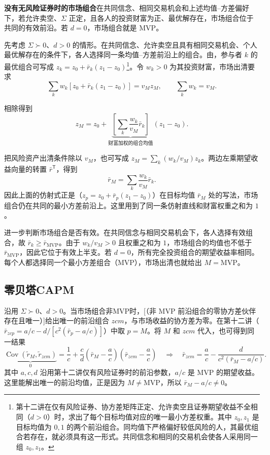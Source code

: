 \begin{tcolorbox}[knowledge]
\textbf{没有无风险证券时的市场组合}\quad 在共同信念、相同交易机会和上述均值--方差偏好下，若允许卖空、$\Sigma$ 正定，且各人的投资财富为正、最优解存在，市场组合位于共同的有效前沿。若 $d=0$，市场组合就是 MVP。
\end{tcolorbox}

\begin{solution}[label-content={证明},blank-type=none]
先考虑 $\Sigma\succ0$、$d>0$ 的情形。在共同信念、允许卖空且具有相同交易机会、个人最优解存在的条件下，各人选择同一条均值--方差前沿上的组合。由，参与者 $k$ 的最优组合可写成 $z_k=z_0+\bar r_k(z_1-z_0)$\footnote{第十二讲在仅有风险证券、协方差矩阵正定、允许卖空且证券期望收益不全相同（$d>0$）时，求出了每个目标均值对应的唯一最小方差权重。其中 $z_0,z_1$ 是目标均值为 $0,1$ 的两个前沿组合。同均值下严格偏好较低风险的人，其最优组合若存在，就必须具有这一形式。共同信念和相同的交易机会使各人采用同一组 $z_0,z_1$。}。令 $w_k>0$ 为其投资财富，市场出清要求
\[
 \sum_kw_k[z_0+\bar r_k(z_1-z_0)]=v_Mz_M,\qquad \sum_kw_k=v_M.
\]

相除得到
\[
 z_M=z_0+\underbrace{\left[\sum_k\frac{w_k}{v_M}\bar r_k\right]}_{\text{财富加权的组合均值}}(z_1-z_0).
\]

把风险资产出清条件除以 $v_M$，也可写成 $z_M=\sum_k(w_k/v_M)z_k$。两边左乘期望收益向量的转置 $\bar r^{\mathsf T}$，得到
\[
 \bar r_M=\sum_k\frac{w_k}{v_M}\bar r_k.
\]
因此上面的仿射式正是（$z_p=z_0+\bar r_p(z_1-z_0)$）在目标均值 $\bar r_M$ 处的写法，市场组合仍在共同的最小方差前沿上。这里用到了同一条仿射直线和财富权重之和为 $1$。

进一步判断市场组合是否有效。在共同信念与相同交易机会下，各人选择有效组合，故 $\bar r_k\ge\bar r_{\mathrm{MVP}}$。由于 $w_k/v_M>0$ 且权重之和为 $1$，市场组合的均值也不低于 $\bar r_{\mathrm{MVP}}$，因此它位于有效上半支。若 $d=0$，所有完全投资组合的期望收益率相同。每个人都选择同一个最小方差组合（MVP），市场出清也就给出 $M=\mathrm{MVP}$。
\end{solution}

\subsection{零贝塔CAPM}
沿用 $\Sigma\succ0$、$d>0$。当市场组合非MVP时，[（非 MVP 前沿组合的零协方差伙伴存在且唯一）]给出唯一的前沿组合 $zcm$，与市场收益的协方差为零。在第十二讲（$\bar r_{zcp}=a/c-d/[c^2(\bar r_p-a/c)]$）中取 $p=M$。将 $M$ 和 $zcm$ 代入，也可得到同一结果
\[
 \underbrace{\operatorname{Cov}(\widetilde r_M,\widetilde r_{zcm})}_{0}
 =\frac1c+\frac cd\left(\bar r_M-\frac ac\right)
                    \left(\bar r_{zcm}-\frac ac\right)
 \quad\Longrightarrow\quad
 \bar r_{zcm}=\frac ac-\frac{d}{c^2(\bar r_M-a/c)}.
\]
其中 $a,c,d$ 沿用第十二讲仅有风险证券时的前沿参数，$a/c$ 是 MVP 的期望收益。这里能解出唯一的前沿均值，正是因为 $M\ne\mathrm{MVP}$，所以 $\bar r_M-a/c\ne0$。

